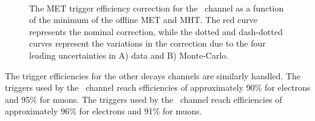 \begin{figure}[htbp]
  \centering
  \mbox{
     \quad
     \quad
  }
  \caption[2017 MET Trigger Efficiency Correction for \ZnnHbb]{The MET trigger efficiency correction for the \ZnnHbb\ channel as a function of the minimum of the offline MET and MHT. The red curve represents the nominal correction, while the dotted and dash-dotted curves represent the variations in the correction due to the four leading uncertainties in A) data and B) Monte-Carlo.}
    \label{fig:triggersunc}
\end{figure}

The trigger efficiencies for the other decays channels are similarly handled. The triggers used by the \WlnH\ channel reach efficiencies of approximately 90\% for electrons and 95\% for muons. The triggers used by the \ZllH\ channel reach efficiencies of approximately 96\% for electrons and 91\% for muons.

